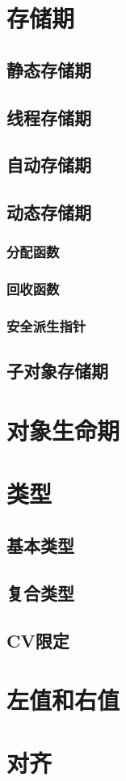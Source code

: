 \section{存储期}
\subsection{静态存储期}
\subsection{线程存储期}
\subsection{自动存储期}

\subsection{动态存储期}
\subsubsection{分配函数}
\subsubsection{回收函数}
\subsubsection{安全派生指针}

\subsection{子对象存储期}

\section{对象生命期}

\section{类型}
\subsection{基本类型}
\subsection{复合类型}
\subsection{CV限定}

\section{左值和右值}

\section{对齐}
